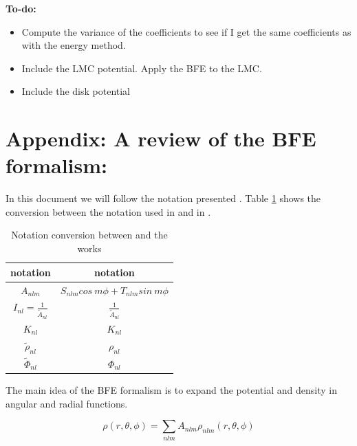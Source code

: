\documentclass[14pt]{article}
\begin{document}
\textbf{To-do:}\\

\begin{itemize}
  \item Compute the variance of the coefficients to see if I get the same
       coefficients as with the energy method.
  \item Include the LMC potential. Apply the BFE to the LMC.
  \item Include the disk potential 
\end{itemize}







\appendix


\section*{Appendix: A review of the BFE formalism:}\label{sec:appendix}

In this document we will follow the notation presented \cite{Lowing11}. Table
\ref{tab:conversion} shows the conversion between the notation used in \cite{Hernquist92} and
in \cite{Lowing11}.

\begin{table}[h]
  \centering
  \begin{tabular}{c  c}
    \hline
    \hline
    \cite{Hernquist92} notation & \cite{Lowing11} notation \\
    \hline
    $A_{nlm}$ & $S_{nlm} cos\ m\phi + T_{nlm}sin\ m\phi $\\
    $I_{nl} = \frac{1}{\tilde{A}_{nl}}$ & $\frac{1}{\tilde{A}_{nl}}$\\
    $K_{nl}$ & $K_{nl}$ \\
    $\tilde{\rho}_{nl}$ & $\rho_{nl}$\\
    $\tilde{\Phi}_{nl}$ & $\Phi_{nl}$\\
    \hline
    \hline
  \end{tabular}
  \caption{Notation conversion between \cite{Hernquist92} and the
  \cite{Lowing11} works}\label{tab:conversion}
\end{table}



The main idea of the BFE formalism is to expand the potential and density in
angular and radial functions. 


\begin{equation}
    \rho(r, \theta, \phi) = \sum_{nlm} A_{nlm}\rho_{nlm}(r, \theta, \phi)
\end{equation}
\end{document}
